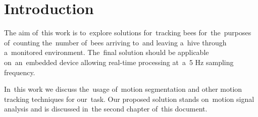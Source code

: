 \chapter*{Introduction}
{}
The aim of~this work is to~explore solutions for~tracking bees for~the~purposes of~counting the~number of~bees arriving to~and leaving a~hive through a~monitored environment. The~final solution should be applicable on~an~embedded device allowing real-time processing at~a~5 Hz sampling frequency.

In~this work we discuss the~usage of~motion segmentation and other motion tracking techniques for our~task. Our proposed solution stands on~motion signal analysis and is discussed in~the second chapter of~this document.